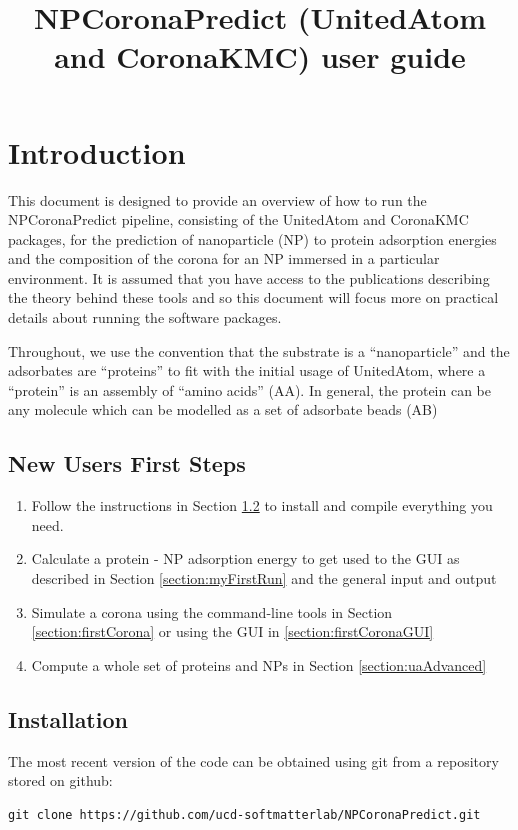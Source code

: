 \documentclass[10pt,a4paper,onecolumn]{report}
\begin{document}
\title{NPCoronaPredict (UnitedAtom and CoronaKMC) user guide}

\maketitle 

\tableofcontents

\chapter{Introduction}
This document is designed to provide an overview of how to run the NPCoronaPredict pipeline, consisting of the UnitedAtom and CoronaKMC packages, for the prediction of nanoparticle (NP) to protein adsorption energies and the composition of the corona for an NP immersed in a particular environment. It is assumed that you have access to the publications describing the theory behind these tools and so this document will focus more on practical details about running the software packages.

Throughout, we use the convention that the substrate is a ``nanoparticle'' and the adsorbates are ``proteins'' to fit with the initial usage of UnitedAtom, where a ``protein'' is an assembly of ``amino acids'' (AA). In general, the protein can be any molecule which can be modelled as a set of adsorbate beads (AB)

\section{New Users First Steps}
\begin{enumerate}
\item Follow the instructions in Section \ref{section:installation} to install and compile everything you need.
\item Calculate a protein - NP adsorption energy to get used to the GUI as described in Section \ref{section:myFirstRun} and the general input and output
\item Simulate a corona using the command-line tools in Section \ref{section:firstCorona} or using the GUI in \ref{section:firstCoronaGUI}
\item Compute a whole set of proteins and NPs in Section \ref{section:uaAdvanced}
\end{enumerate}


\section{Installation} \label{section:installation}
The most recent version of the code can be obtained using git from a repository stored on github:
\begin{lstlisting}
git clone https://github.com/ucd-softmatterlab/NPCoronaPredict.git
\end{lstlisting}
\end{document}
